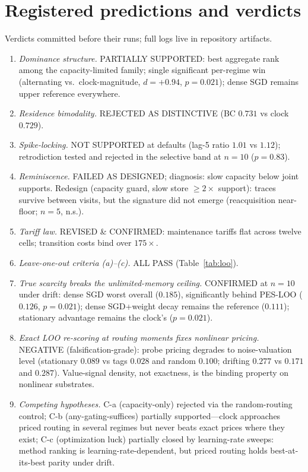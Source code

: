\documentclass[10pt,twocolumn]{article}
\theoremstyle{definition}
\newcommand{\PES}{PES}
\begin{document}
\section{Registered predictions and verdicts}\label{app:predictions}
Verdicts committed before their runs; full logs live in repository artifacts.
\begin{enumerate}\setlength{\itemsep}{1pt}
\item[\textbf{P1}] \emph{Dominance structure.} PARTIALLY SUPPORTED: best aggregate rank among the
capacity-limited family; single significant per-regime win (alternating vs.\ clock-magnitude, $d{=}+0.94$,
$p=0.021$); dense {SGD} remains upper reference everywhere.
\item[\textbf{P2}] \emph{Residence bimodality.} REJECTED AS DISTINCTIVE ({BC} $0.731$ vs clock $0.729$).
\item[\textbf{P3}] \emph{Spike-locking.} NOT SUPPORTED at defaults (lag-5 ratio $1.01$ vs $1.12$);
retrodiction tested and rejected in the selective band at $n{=}10$ ($p=0.83$).
\item[\textbf{P4}] \emph{Reminiscence.} FAILED AS DESIGNED; diagnosis: slow capacity below joint supports.
Redesign (capacity guard, slow store $\ge 2\times$ support): traces survive between visits, but the
signature did not emerge (reacquisition near-floor; $n{=}5$, n.s.).
\item[\textbf{P5}] \emph{Tariff law.} REVISED \& CONFIRMED: maintenance tariffs flat across twelve cells;
transition costs bind over $175\times$.
\item[\textbf{R7}] \emph{Leave-one-out criteria (a)--(c).} ALL PASS (Table~\ref{tab:loo}).
\item[\textbf{R9}] \emph{True scarcity breaks the unlimited-memory ceiling.} CONFIRMED at $n{=}10$ under
drift: dense {SGD} worst overall ($0.185$), significantly behind \PES{}-{LOO} ($0.126$, $p=0.021$);
dense {SGD}+weight decay remains the reference ($0.111$); stationary advantage remains the clock's
($p=0.021$).
\item[\textbf{R7-MLP}] \emph{Exact LOO re-scoring at routing moments fixes nonlinear pricing.} NEGATIVE
(falsification-grade): probe pricing degrades to noise-valuation level (stationary $0.089$ vs tags $0.028$
and random $0.100$; drifting $0.277$ vs $0.171$ and $0.287$). Value-signal density, not exactness, is the
binding property on nonlinear substrates.
\item[\textbf{C-a/b/c}] \emph{Competing hypotheses.} C-a (capacity-only) rejected via the random-routing
control; C-b (any-gating-suffices) partially supported---clock approaches priced routing in several regimes
but never beats exact prices where they exist; C-c (optimization luck) partially closed by learning-rate
sweeps: method ranking is learning-rate-dependent, but priced routing holds best-at-its-best parity under
drift.
\end{enumerate}
\end{document}
